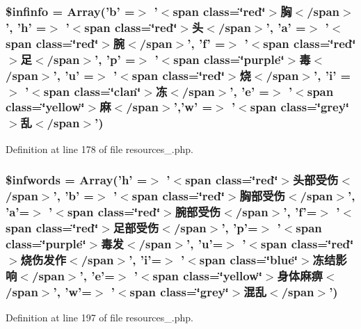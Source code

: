 \hypertarget{cache_2resources__1_8php_a33e1d274ac0cd7ca76b5cc43833f5c1f}{
\subsubsection[{\$infinfo}]{\setlength{\rightskip}{0pt plus 5cm}\$infinfo = Array('b' =$>$ '$<$span class=\char`\"{}red\char`\"{}$>$胸$<$/span$>$', 'h' =$>$ '$<$span class=\char`\"{}red\char`\"{}$>$头$<$/span$>$', 'a' =$>$ '$<$span class=\char`\"{}red\char`\"{}$>$腕$<$/span$>$', 'f' =$>$ '$<$span class=\char`\"{}red\char`\"{}$>$足$<$/span$>$', 'p' =$>$ '$<$span class=\char`\"{}purple\char`\"{}$>$毒$<$/span$>$', 'u' =$>$ '$<$span class=\char`\"{}red\char`\"{}$>$烧$<$/span$>$', 'i' =$>$ '$<$span class=\char`\"{}clan\char`\"{}$>$冻$<$/span$>$', 'e' =$>$ '$<$span class=\char`\"{}yellow\char`\"{}$>$麻$<$/span$>$','w' =$>$ '$<$span class=\char`\"{}grey\char`\"{}$>$乱$<$/span$>$')}}\label{cache_2resources__1_8php_a33e1d274ac0cd7ca76b5cc43833f5c1f}


Definition at line 178 of file resources\+\_.\+php.

\hypertarget{cache_2resources__1_8php_ac3527ff4180f28da3e03cb071838cc4d}{
\subsubsection[{\$infwords}]{\setlength{\rightskip}{0pt plus 5cm}\$infwords = Array('h' =$>$ '$<$span class=\char`\"{}red\char`\"{}$>$头部受伤$<$/span$>$', 'b' =$>$ '$<$span class=\char`\"{}red\char`\"{}$>$胸部受伤$<$/span$>$', 'a'=$>$ '$<$span class=\char`\"{}red\char`\"{}$>$腕部受伤$<$/span$>$', 'f'=$>$ '$<$span class=\char`\"{}red\char`\"{}$>$足部受伤$<$/span$>$', 'p'=$>$ '$<$span class=\char`\"{}purple\char`\"{}$>$毒发$<$/span$>$', 'u'=$>$ '$<$span class=\char`\"{}red\char`\"{}$>$烧伤发作$<$/span$>$', 'i'=$>$ '$<$span class=\char`\"{}blue\char`\"{}$>$冻结影响$<$/span$>$', 'e'=$>$ '$<$span class=\char`\"{}yellow\char`\"{}$>$身体麻痹$<$/span$>$', 'w'=$>$ '$<$span class=\char`\"{}grey\char`\"{}$>$混乱$<$/span$>$')}}\label{cache_2resources__1_8php_ac3527ff4180f28da3e03cb071838cc4d}


Definition at line 197 of file resources\+\_.\+php.


